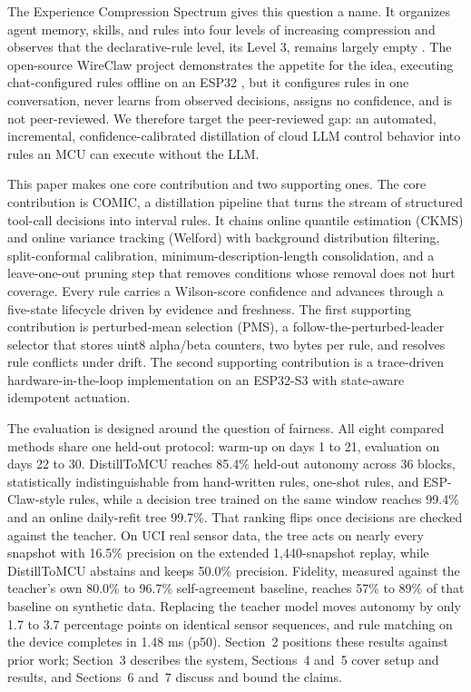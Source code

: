 \documentclass[review]{elsarticle}
\begin{document}
The Experience Compression Spectrum gives this question a name. It organizes
agent memory, skills, and rules into four levels of increasing compression and
observes that the declarative-rule level, its Level 3, remains largely empty
\cite{11}. The open-source WireClaw project demonstrates the appetite for the
idea, executing chat-configured rules offline on an ESP32 \cite{12}, but it
configures rules in one conversation, never learns from observed decisions,
assigns no confidence, and is not peer-reviewed. We therefore target the
peer-reviewed gap: an automated, incremental, confidence-calibrated
distillation of cloud LLM control behavior into rules an MCU can execute
without the LLM.

This paper makes one core contribution and two supporting ones. The core
contribution is COMIC, a distillation pipeline that turns the stream of
structured tool-call decisions into interval rules. It chains online quantile
estimation (CKMS) and online variance tracking (Welford) with background
distribution filtering, split-conformal calibration,
minimum-description-length consolidation, and a leave-one-out pruning step
that removes conditions whose removal does not hurt coverage. Every rule
carries a Wilson-score confidence and advances through a five-state lifecycle
driven by evidence and freshness. The first supporting contribution is
perturbed-mean selection (PMS), a follow-the-perturbed-leader selector that
stores uint8 alpha/beta counters, two bytes per rule, and resolves rule
conflicts under drift. The second supporting contribution is a trace-driven
hardware-in-the-loop implementation on an ESP32-S3 with state-aware idempotent
actuation.

The evaluation is designed around the question of fairness. All eight compared
methods share one held-out protocol: warm-up on days 1 to 21, evaluation on
days 22 to 30. DistillToMCU reaches 85.4\% held-out autonomy across 36
blocks, statistically indistinguishable from hand-written rules, one-shot
rules, and ESP-Claw-style rules, while a decision tree trained on the same
window reaches 99.4\% and an online daily-refit tree 99.7\%. That ranking
flips once decisions are checked against the teacher. On UCI real sensor
data, the tree acts on nearly every snapshot with 16.5\% precision on the
extended 1,440-snapshot replay, while DistillToMCU abstains and keeps 50.0\%
precision. Fidelity, measured against the teacher's own 80.0\% to 96.7\%
self-agreement baseline, reaches 57\% to 89\% of that baseline on synthetic
data. Replacing the teacher model moves autonomy by only 1.7 to 3.7
percentage points on identical sensor sequences, and rule matching on the
device completes in 1.48 ms (p50). Section~2 positions these results against
prior work; Section~3 describes the system, Sections~4 and~5 cover setup and
results, and Sections~6 and~7 discuss and bound the claims.
\end{document}
